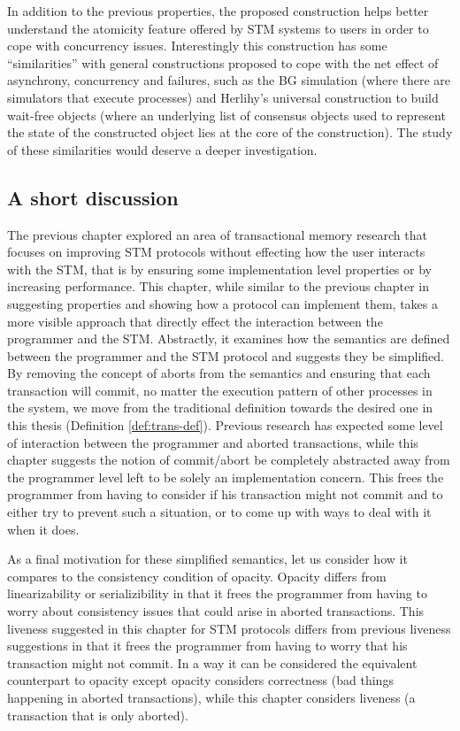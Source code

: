 In addition to the previous properties, 
the proposed  construction helps better understand the atomicity feature  
offered  by STM systems to users in order to cope with concurrency issues. 
Interestingly this construction has some ``similarities'' with 
general constructions proposed to cope with the net effect of 
asynchrony, concurrency and failures, such as 
the BG simulation \cite{BG93}  (where there are simulators that execute 
processes) and   Herlihy's universal construction to  build  wait-free 
objects \cite{H91} (where an underlying list of consensus objects 
used to represent the state of the constructed object lies at the 
core of the construction). The study of these  similarities would 
deserve a  deeper investigation.

\subsection{A short discussion}
The previous chapter explored an area of transactional memory
research that focuses on improving STM protocols without effecting
how the user interacts with the STM, that is by ensuring some implementation
level properties or by increasing performance.
This chapter, while similar to the previous chapter in suggesting properties
and showing how a protocol can implement them,
takes a more visible approach
that directly effect the interaction between the programmer and
the STM.
Abstractly, it examines how the semantics are defined between
the programmer and the STM protocol and suggests they be simplified.
By removing the concept of aborts from the semantics and
ensuring that each transaction will commit, no matter the 
execution pattern of other processes in the system, we move from
the traditional definition towards the desired one in this thesis
(Definition \ref{def:trans-def}).
Previous research has expected some level of interaction
between the programmer and aborted transactions, while this
chapter suggests the notion of commit/abort be completely abstracted
away from the programmer level left to be solely an implementation
concern.
This frees the programmer from having to consider if his transaction
might not commit and to either try to prevent such a situation, or to 
come up with ways to deal with it when it does.

As a final motivation for these simplified semantics, let us consider how it compares
to the consistency condition of opacity.
Opacity differs from linearizability or serializibility in that
it frees the programmer from having to worry about consistency
issues that could arise in aborted transactions.
This liveness suggested in this chapter for STM protocols differs
from previous liveness suggestions in that it frees the programmer from
having to worry that his transaction might not commit.
In a way it can be considered the equivalent counterpart to opacity except
opacity considers correctness (bad things happening in aborted transactions),
while this chapter considers liveness (a transaction that is only aborted).

